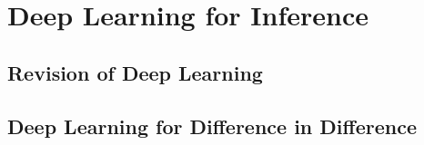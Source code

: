 \section{Deep Learning for Inference}

\subsection{Revision of Deep Learning}


\subsection{Deep Learning for Difference in Difference}
